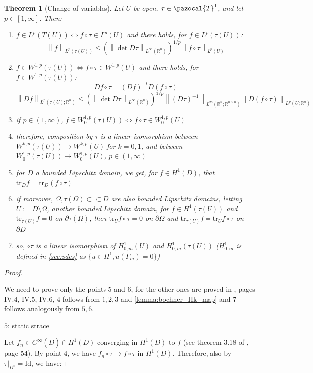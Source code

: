 \documentclass[english,a4paper,9pt,oneside]{scrbook}	%
\theoremstyle{break}
\newtheorem{thm}[equation]{Theorem}
\newenvironment{mproof}[1][\proofname]{%
  \begin{proof}[#1]$ $\par\nobreak\ignorespaces
}{%
  \end{proof}
}
\renewcommand*{\proofname}{Proof}
\theoremstyle{remark}
\newcommand{\mR}{\mathbb{R}}
\newcommand{\norm}[1]{\left\lVert#1\right\rVert}
\newcommand{\tr}{\text{tr}}
\newcommand{\cc}{\subset\subset}
\newcommand{\cT}{\pazocal{T}}
\newcommand{\id}{\text{Id}}
\begin{document}
\begin{appendices}
\begin{thm}[Change of variables]
Let $U$ be open, $\tau \in \cT^1$, and let $p \in [ 1,\infty]$. Then:

\begin{enumerate}
	\item $f \in L^p(T(U)) \iff f\circ \tau \in L^p(U)$ and there holds, for $f \in L^p(\tau(U))$:
	$$ \norm{f}_{L^p(\tau(U))}\leq \left ( \norm{\det D\tau}_{L^\infty(\mR^n)}\right)^{1/p} \norm{f\circ \tau}_{L^p(U)}$$
	\item $f \in W^{1,p}(\tau(U)) \iff f\circ \tau \in W^{1,p}(U)$ and there holds, for $f\in W^{1,p}(\tau(U))$:
	$$Df \circ \tau = (Df)^{-t}D(f\circ \tau)$$
	$$ \norm{Df}_{L^p(\tau(U);\mR^n)}\leq \left ( \norm{\det D\tau}_{L^\infty(\mR^n)}\right)^{1/p} \norm{(D\tau)^{-1}}_{L^\infty(\mR^n;\mR^{n\times n})}\norm{D(f\circ \tau)}_{L^p(U;\mR^n)}$$
	\item if $p \in (1, \infty)$, $f \in W^{1,p}_0(\tau(U)) \iff f\circ \tau \in W^{1,p}_0(U)$
	\item therefore, composition by $\tau$ is a linear isomorphism between $W^{k,p}(\tau(U))\rightarrow W^{k,p}(U)$ for $k=0,1$, and between $W^{1,p}_0(\tau(U))\rightarrow W^{1,p}_0(U)$, $p \in (1, \infty)$
	\item for $D$ a bounded Lipschitz domain, we get, for $f \in H^1(D)$, that $\tr_D f = \tr_D(f\circ \tau)$
	\item if moreover, $\Omega, \tau(\Omega) \cc D$ are also bounded Lipschitz domains, letting $U:=D\setminus \overline{\Omega}$, another bounded Lipschitz domain, for $f \in H^1(\tau(U))$ and $\tr_{\tau(U)} f =0 $ on $ \partial \tau(\Omega) $, then $\tr_{U} f\circ \tau=0$ on $\partial \Omega$ and $\tr_{\tau(U)} f = \tr_{U} f\circ \tau$ on $\partial D$
	\item so, $\circ \tau$ is a linear isomorphism of $H^1_{0,m}(U)$ and $H^1_{0,m}(\tau(U))$ ($H^1_{0,m}$ is defined in \cref{sec:pdes} as $\{u \in H^1, u(\Gamma_m)=0\}$)
\end{enumerate}

\end{thm}

\begin{mproof}

We need to prove only the points $5$ and $6$, for the other ones are proved in \cite{murat}, pages IV.4, IV.5, IV.6, $4$ follows from $1,2,3$ and \cref{lemma:bochner_Hk_map} and $7$ follows analogously from $5,6$.

\underline{$5$: static strace}

Let $f_n \in C^\infty(\overline{D})\cap H^1(D)$ converging in $H^1(D)$ to $f$ (see theorem 3.18 of \cite{adams}, page 54). By point 4, we have $f_n \circ \tau\rightarrow f\circ \tau$ in $H^1(D)$. Therefore, also by $\tau|_{D^c} = \id$, we have:


\end{mproof}
\end{appendices}
\end{document}
